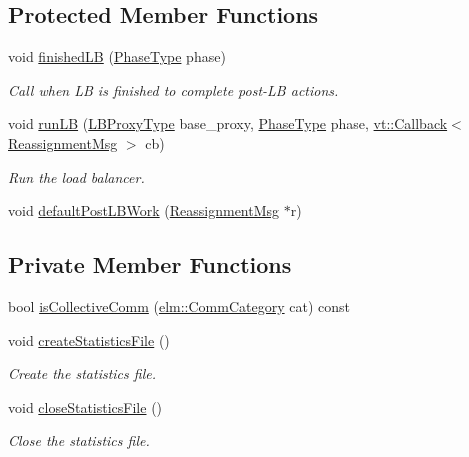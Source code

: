 \subsection*{Protected Member Functions}
\begin{DoxyCompactItemize}
\item 
void \hyperlink{structvt_1_1vrt_1_1collection_1_1balance_1_1_l_b_manager_a7b5455f6e85bb16453971e49ab6450fa}{finished\+LB} (\hyperlink{namespacevt_a46ce6733d5cdbd735d561b7b4029f6d7}{Phase\+Type} phase)
\begin{DoxyCompactList}\small\item\em Call when LB is finished to complete post-\/\+LB actions. \end{DoxyCompactList}\item 
void \hyperlink{structvt_1_1vrt_1_1collection_1_1balance_1_1_l_b_manager_ab84009eab6929b2a915233be12747dbb}{run\+LB} (\hyperlink{structvt_1_1vrt_1_1collection_1_1balance_1_1_l_b_manager_a8b1a7735366beb85c2c2ccc3912cdd80}{L\+B\+Proxy\+Type} base\+\_\+proxy, \hyperlink{namespacevt_a46ce6733d5cdbd735d561b7b4029f6d7}{Phase\+Type} phase, \hyperlink{namespacevt_a36db99df4c973d48b1118a293fff533f}{vt\+::\+Callback}$<$ \hyperlink{structvt_1_1vrt_1_1collection_1_1balance_1_1_reassignment_msg}{Reassignment\+Msg} $>$ cb)
\begin{DoxyCompactList}\small\item\em Run the load balancer. \end{DoxyCompactList}\item 
void \hyperlink{structvt_1_1vrt_1_1collection_1_1balance_1_1_l_b_manager_a702179841dc5bb5f730bf81a74092ae2}{default\+Post\+L\+B\+Work} (\hyperlink{structvt_1_1vrt_1_1collection_1_1balance_1_1_reassignment_msg}{Reassignment\+Msg} $\ast$r)
\end{DoxyCompactItemize}
\subsection*{Private Member Functions}
\begin{DoxyCompactItemize}
\item 
bool \hyperlink{structvt_1_1vrt_1_1collection_1_1balance_1_1_l_b_manager_acf0c8a9a18f038e2c5c5ae9c7e17615e}{is\+Collective\+Comm} (\hyperlink{namespacevt_1_1elm_ab7367fdbe88bdcf329563642147f9ae2}{elm\+::\+Comm\+Category} cat) const
\item 
void \hyperlink{structvt_1_1vrt_1_1collection_1_1balance_1_1_l_b_manager_af799741f6f75f520eb8b576ac2732683}{create\+Statistics\+File} ()
\begin{DoxyCompactList}\small\item\em Create the statistics file. \end{DoxyCompactList}\item 
void \hyperlink{structvt_1_1vrt_1_1collection_1_1balance_1_1_l_b_manager_a7fcd0cc4e6fa9a101411ece9bc687141}{close\+Statistics\+File} ()
\begin{DoxyCompactList}\small\item\em Close the statistics file. \end{DoxyCompactList}\end{DoxyCompactItemize}
